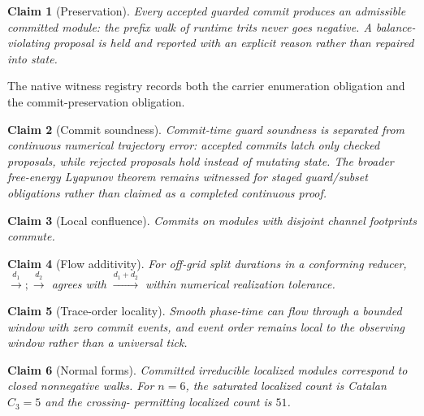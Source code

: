 \documentclass[11pt]{article}
\newtheorem{claim}{Claim}
\begin{document}
\begin{claim}[Preservation]
Every accepted guarded commit produces an admissible committed module: the
prefix walk of runtime trits never goes negative. A balance-violating proposal is
held and reported with an explicit reason rather than repaired into state.
\end{claim}

The native witness registry records both the carrier enumeration obligation and
the commit-preservation obligation.

\begin{claim}[Commit soundness]
Commit-time guard soundness is separated from continuous numerical trajectory
error: accepted commits latch only checked proposals, while rejected proposals
hold instead of mutating state. The broader free-energy Lyapunov theorem remains
witnessed for staged guard/subset obligations rather than claimed as a completed
continuous proof.
\end{claim}

\begin{claim}[Local confluence]
Commits on modules with disjoint channel footprints commute.
\end{claim}

\begin{claim}[Flow additivity]
For off-grid split durations in a conforming reducer,
$\xrightarrow{d_1};\xrightarrow{d_2}$ agrees with $\xrightarrow{d_1+d_2}$
within numerical realization tolerance.
\end{claim}

\begin{claim}[Trace-order locality]
Smooth phase-time can flow through a bounded window with zero commit events, and
event order remains local to the observing window rather than a universal tick.
\end{claim}

\begin{claim}[Normal forms]
Committed irreducible localized modules correspond to closed nonnegative walks.
For $n=6$, the saturated localized count is Catalan $C_3=5$ and the crossing-
permitting localized count is $51$.
\end{claim}
\end{document}

